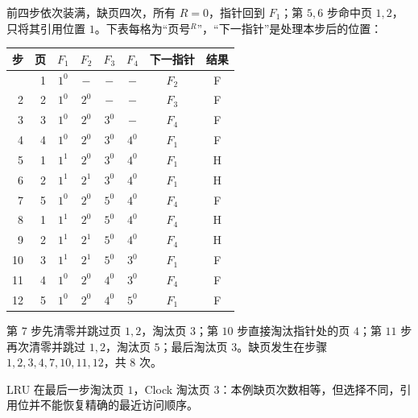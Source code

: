 \begin{checkedsolution}
前四步依次装满，缺页四次，所有 $R=0$，指针回到 $F_1$；第 $5,6$ 步命中页 $1,2$，只将其引用位置 $1$。下表每格为“页号$^{R}$”，“下一指针”是处理本步后的位置：
{\small
\begin{longtable}{@{}rrcccccc@{}}
\toprule
步 & 页 & $F_1$ & $F_2$ & $F_3$ & $F_4$ & 下一指针 & 结果 \\
\midrule
\endhead
\bottomrule
\endfoot
1  & 1 & $1^0$ & $-$ & $-$ & $-$ & $F_2$ & F \\
2  & 2 & $1^0$ & $2^0$ & $-$ & $-$ & $F_3$ & F \\
3  & 3 & $1^0$ & $2^0$ & $3^0$ & $-$ & $F_4$ & F \\
4  & 4 & $1^0$ & $2^0$ & $3^0$ & $4^0$ & $F_1$ & F \\
5  & 1 & $1^1$ & $2^0$ & $3^0$ & $4^0$ & $F_1$ & H \\
6  & 2 & $1^1$ & $2^1$ & $3^0$ & $4^0$ & $F_1$ & H \\
7  & 5 & $1^0$ & $2^0$ & $5^0$ & $4^0$ & $F_4$ & F \\
8  & 1 & $1^1$ & $2^0$ & $5^0$ & $4^0$ & $F_4$ & H \\
9  & 2 & $1^1$ & $2^1$ & $5^0$ & $4^0$ & $F_4$ & H \\
10 & 3 & $1^1$ & $2^1$ & $5^0$ & $3^0$ & $F_1$ & F \\
11 & 4 & $1^0$ & $2^0$ & $4^0$ & $3^0$ & $F_4$ & F \\
12 & 5 & $1^0$ & $2^0$ & $4^0$ & $5^0$ & $F_1$ & F \\
\end{longtable}}
第 $7$ 步先清零并跳过页 $1,2$，淘汰页 $3$；第 $10$ 步直接淘汰指针处的页 $4$；第 $11$ 步再次清零并跳过 $1,2$，淘汰页 $5$；最后淘汰页 $3$。缺页发生在步骤 $1,2,3,4,7,10,11,12$，共 $\boxed{8}$ 次。

LRU 在最后一步淘汰页 $1$，Clock 淘汰页 $3$：本例缺页次数相等，但选择不同，引用位并不能恢复精确的最近访问顺序。
\end{checkedsolution}
\endgroup
